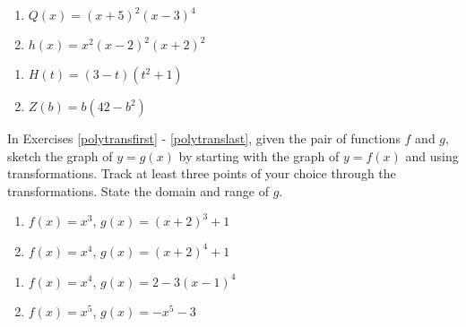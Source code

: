 \documentclass{ximera}
\begin{document}
\begin{enumerate}
\setcounter{enumi}{\value{HW}}

\item $Q(x) = (x + 5)^{2}(x - 3)^{4}$
\item $h(x) = x^2(x-2)^2(x+2)^2$

\setcounter{HW}{\value{enumi}}
\end{enumerate}


\begin{enumerate}
\setcounter{enumi}{\value{HW}}

\item $H(t) = (3-t)(t^2+1)$
\item $Z(b) = b(42 - b^{2})$ \label{zeromultgraphlast}

\setcounter{HW}{\value{enumi}}
\end{enumerate}




In Exercises \ref{polytransfirst} - \ref{polytranslast}, given the pair of functions $f$ and $g$, sketch the graph of $y=g(x)$ by starting with the graph of $y = f(x)$ and using transformations.  Track at least three points of your choice through the transformations. State the domain and range of $g$.

\begin{enumerate}
\setcounter{enumi}{\value{HW}}

\item $f(x) = x^3$,  $g(x) = (x + 2)^{3} + 1$ \label{polytransfirst}
\item $f(x) = x^4$, $g(x) = (x + 2)^{4} + 1$

\setcounter{HW}{\value{enumi}}
\end{enumerate}

\begin{enumerate}
\setcounter{enumi}{\value{HW}}

\item $f(x) = x^4$, $g(x) = 2 - 3(x - 1)^{4}$
\item $f(x) = x^5$, $g(x) = -x^{5} - 3$

\setcounter{HW}{\value{enumi}}
\end{enumerate}
\end{document}
